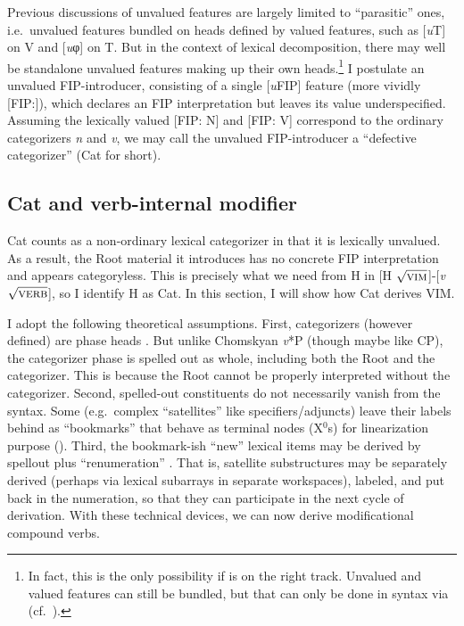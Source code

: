 \documentclass[output=paper]{langsci/langscibook}
\begin{document}
Previous discussions of unvalued features are largely limited to ``parasitic''
ones, i.e.\ unvalued features bundled on heads defined by valued features, such
as [{\em u}T] on V and [{\em u}φ] on T.
But in the context of lexical decomposition, there may well be standalone
unvalued features making up their own heads.\footnote{In fact, this is the only
possibility if \citet{Collins2017} is on the right track. Unvalued and valued
features can still be bundled, but that can only be done in syntax via 
(cf.\ ).} I postulate an unvalued FIP-introducer, consisting of a
single [{\em u}FIP] feature (more vividly [FIP:\uline{\hspace{3mm}}]),
which declares an \gls{FIP} interpretation but leaves its value underspecified.
Assuming the lexically valued [FIP: N] and [FIP: V] correspond to the ordinary
categorizers {\em n} and {\em v}, we may call the unvalued FIP-introducer a
``defective categorizer'' (Cat for short).

\subsection{Cat and verb-internal modifier}\label{sec4.3}

Cat counts as a non-ordinary lexical categorizer in that it is lexically
unvalued. As a result, the Root material it introduces has no concrete \gls{FIP}
interpretation and appears categoryless. This is precisely what we need from H
in [H {$\sqrt{\textrm{\textsc{vim}}}$}]-[{\em v}
{$\sqrt{\textrm{\textsc{verb}}}$}], so I identify H as Cat. In this section, I
will show how Cat derives \gls{VIM}.

I adopt the following theoretical assumptions. First, categorizers (however
defined) are phase heads \citep[\`{a} la][]{Marantz2001b}. But unlike Chomskyan
{\em v}*P (though maybe like CP), the categorizer phase is spelled out as
whole, including both the Root and the categorizer. This is because the Root
cannot be properly interpreted without the categorizer. Second, spelled-out
constituents do not necessarily vanish from the syntax. Some (e.g.\ complex
``satellites'' like specifiers/adjuncts) leave their labels behind as
``bookmarks'' that behave as terminal nodes (X$^0$s) for linearization purpose
(\citealt{NunesUriagereka2000,Fowlie2013}). Third, the bookmark-ish
``new'' lexical items may be derived by spellout plus ``renumeration''
\citep{Johnson2003}. That is, satellite substructures may be separately derived
(perhaps via lexical subarrays in separate workspaces), labeled, and put back
in the numeration, so that they can participate in the next cycle of
derivation. With these technical devices, we can now derive modificational
compound verbs.
\end{document}
